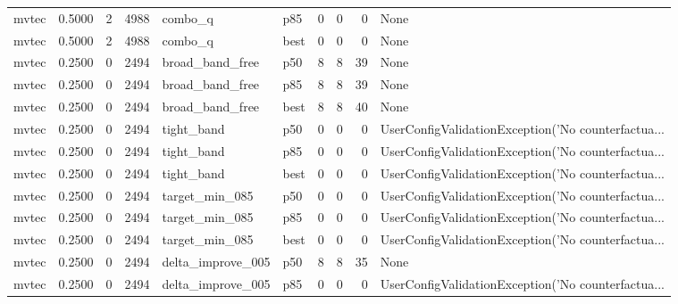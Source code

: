 \begin{tabular}{lrrrllrrrl}
   mvtec &    0.5000 &    2 &   4988 &              combo\_q &    p85 &               0 &          0 &       0 &                                               None \\
   mvtec &    0.5000 &    2 &   4988 &              combo\_q &   best &               0 &          0 &       0 &                                               None \\
   mvtec &    0.2500 &    0 &   2494 &      broad\_band\_free &    p50 &               8 &          8 &      39 &                                               None \\
   mvtec &    0.2500 &    0 &   2494 &      broad\_band\_free &    p85 &               8 &          8 &      39 &                                               None \\
   mvtec &    0.2500 &    0 &   2494 &      broad\_band\_free &   best &               8 &          8 &      40 &                                               None \\
   mvtec &    0.2500 &    0 &   2494 &           tight\_band &    p50 &               0 &          0 &       0 & UserConfigValidationException('No counterfactua... \\
   mvtec &    0.2500 &    0 &   2494 &           tight\_band &    p85 &               0 &          0 &       0 & UserConfigValidationException('No counterfactua... \\
   mvtec &    0.2500 &    0 &   2494 &           tight\_band &   best &               0 &          0 &       0 & UserConfigValidationException('No counterfactua... \\
   mvtec &    0.2500 &    0 &   2494 &       target\_min\_085 &    p50 &               0 &          0 &       0 & UserConfigValidationException('No counterfactua... \\
   mvtec &    0.2500 &    0 &   2494 &       target\_min\_085 &    p85 &               0 &          0 &       0 & UserConfigValidationException('No counterfactua... \\
   mvtec &    0.2500 &    0 &   2494 &       target\_min\_085 &   best &               0 &          0 &       0 & UserConfigValidationException('No counterfactua... \\
   mvtec &    0.2500 &    0 &   2494 &    delta\_improve\_005 &    p50 &               8 &          8 &      35 &                                               None \\
   mvtec &    0.2500 &    0 &   2494 &    delta\_improve\_005 &    p85 &               0 &          0 &       0 & UserConfigValidationException('No counterfactua... \\

\end{tabular}
